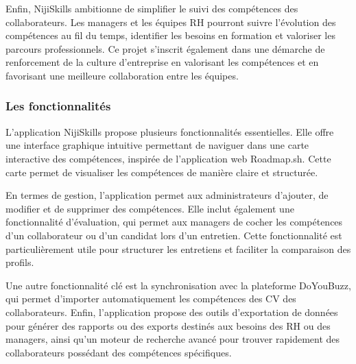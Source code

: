 \documentclass[12pt]{article}
\begin{document}
Enfin, NijiSkills ambitionne de simplifier le suivi des compétences des collaborateurs. Les managers et les équipes RH pourront suivre l'évolution des compétences au fil du temps, identifier les besoins en formation et valoriser les parcours professionnels. Ce projet s'inscrit également dans une démarche de renforcement de la culture d'entreprise en valorisant les compétences et en favorisant une meilleure collaboration entre les équipes.


\subsubsection{Les fonctionnalités}
L'application NijiSkills propose plusieurs fonctionnalités essentielles. Elle offre une interface graphique intuitive permettant de naviguer dans une carte interactive des compétences, inspirée de l'application web Roadmap.sh. Cette carte permet de visualiser les compétences de manière claire et structurée.

En termes de gestion, l'application permet aux administrateurs d'ajouter, de modifier et de supprimer des compétences. Elle inclut également une fonctionnalité d'évaluation, qui permet aux managers de cocher les compétences d'un collaborateur ou d'un candidat lors d'un entretien. Cette fonctionnalité est particulièrement utile pour structurer les entretiens et faciliter la comparaison des profils.

Une autre fonctionnalité clé est la synchronisation avec la plateforme DoYouBuzz, qui permet d'importer automatiquement les compétences des CV des collaborateurs. Enfin, l'application propose des outils d'exportation de données pour générer des rapports ou des exports destinés aux besoins des RH ou des managers, ainsi qu'un moteur de recherche avancé pour trouver rapidement des collaborateurs possédant des compétences spécifiques.
\end{document}
